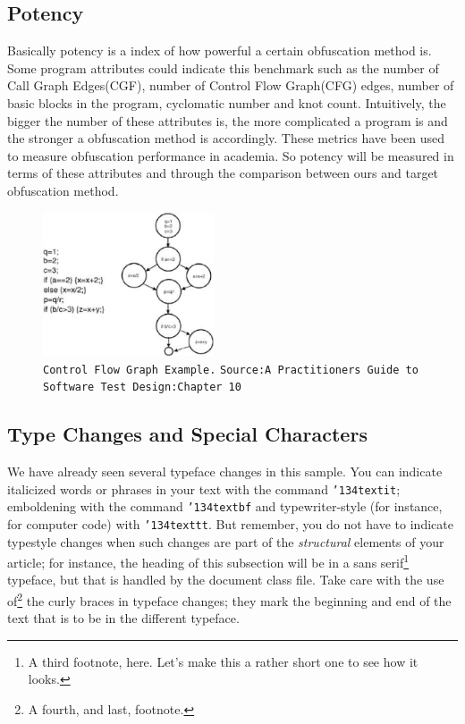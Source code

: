 \documentclass{sig-alternate-05-2015}
\begin{document}
\subsection{Potency}
Basically potency is a index of how powerful a certain obfuscation method is. Some program attributes could indicate this benchmark such as the number of Call Graph Edges(CGF), number of Control Flow Graph(CFG) edges, number of basic blocks in the program, cyclomatic number and knot count. Intuitively, the bigger the number of these attributes is, the more complicated a program is and the stronger a obfuscation method is accordingly. These metrics have been used to measure obfuscation performance in academia. So potency will be measured in terms of these attributes and through the comparison between ours and target obfuscation method.
\begin{figure}
\centering
\includegraphics[width=0.45\textwidth]{CFG}
\caption
{
\texttt{Control Flow Graph Example.} 
\texttt{Source:A Practitioners Guide to Software Test Design:Chapter 10}
}

\end{figure}

\subsection{}
\subsection{Type Changes and {\subsecit Special} Characters}
We have already seen several typeface changes in this sample.  You
can indicate italicized words or phrases in your text with
the command \texttt{{\char'134}textit}; emboldening with the
command \texttt{{\char'134}textbf}
and typewriter-style (for instance, for computer code) with
\texttt{{\char'134}texttt}.  But remember, you do not
have to indicate typestyle changes when such changes are
part of the \textit{structural} elements of your
article; for instance, the heading of this subsection will
be in a sans serif\footnote{A third footnote, here.
Let's make this a rather short one to
see how it looks.} typeface, but that is handled by the
document class file. Take care with the use
of\footnote{A fourth, and last, footnote.}
the curly braces in typeface changes; they mark
the beginning and end of
the text that is to be in the different typeface.
\end{document}
